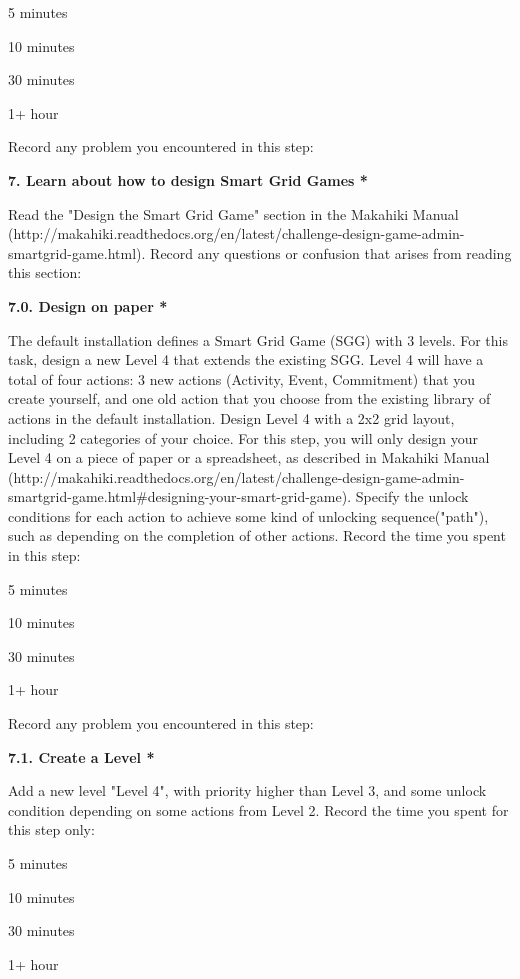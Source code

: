 \begin{compactitem}
\item 5 minutes
\item  10 minutes
\item  30 minutes
\item  1+ hour
\end{compactitem}


Record any problem you encountered in this step:

{\bf 7. Learn about how to design Smart Grid Games *}

Read the "Design the Smart Grid Game" section in the Makahiki Manual (http://makahiki.readthedocs.org/en/latest/challenge-design-game-admin-smartgrid-game.html). Record any questions or confusion that arises from reading this section:

{\bf 7.0. Design on paper *}

The default installation defines a Smart Grid Game (SGG) with 3 levels. For this task, design a new Level 4 that extends the existing SGG. Level 4 will have a total of four actions: 3 new actions (Activity, Event, Commitment) that you create yourself, and one old action that you choose from the existing library of actions in the default installation. Design Level 4 with a 2x2 grid layout, including 2 categories of your choice. For this step, you will only design your Level 4 on a piece of paper or a spreadsheet, as described in Makahiki Manual (http://makahiki.readthedocs.org/en/latest/challenge-design-game-admin-smartgrid-game.html\#designing-your-smart-grid-game). Specify the unlock conditions for each action to achieve some kind of unlocking sequence("path"), such as depending on the completion of other actions. Record the time you spent in this step:

\begin{compactitem}
\item 5 minutes
\item  10 minutes
\item  30 minutes
\item  1+ hour
\end{compactitem}


Record any problem you encountered in this step:

{\bf 7.1. Create a Level *}

Add a new level "Level 4", with priority higher than Level 3, and some unlock condition depending on some actions from Level 2. Record the time you spent for this step only:

\begin{compactitem}
\item 5 minutes
\item  10 minutes
\item  30 minutes
\item  1+ hour
\end{compactitem}


